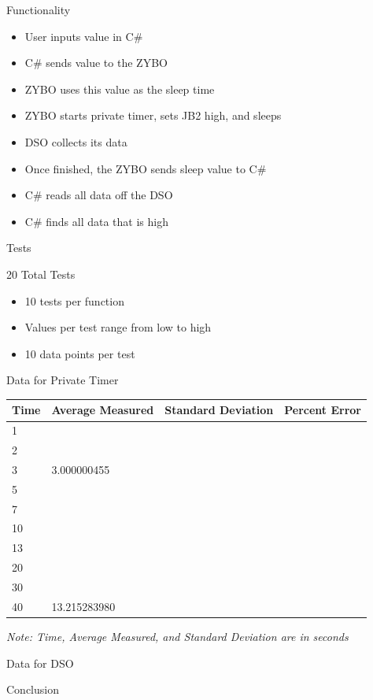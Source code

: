 \documentclass[pdf]{beamer}
\begin{document}
\begin{frame}{Functionality}

  \begin{itemize}
  \item User inputs value in C\#
  \item C\# sends value to the ZYBO
  \end{itemize}
  
  \pause

  \begin{itemize}
  \item ZYBO uses this value as the sleep time
  \item ZYBO starts private timer, sets JB2 high, and sleeps
  \item DSO collects its data
  \end{itemize}
  
  \pause
  
  \begin{itemize}
  \item Once finished, the ZYBO sends sleep value to C\#
  \item C\# reads all data off the DSO
  \item C\# finds all data that is high
  \end{itemize}

\end{frame}

\begin{frame}{Tests}

  20 Total Tests
  \begin{itemize}
  \item 10 tests per function
  \item Values per test range from low to high
  \item 10 data points per test
  \end{itemize}
    
\end{frame}

\begin{frame}{Data for Private Timer}
  \begin{tabular}{|l|l|l|l|}
    \hline
    Time & Average Measured & Standard Deviation & Percent Error\\
    \hline
    1 &  &  & \\ \hline
    2 &  &  & \\ \hline
    3 & 3.000000455 &  & \\ \hline
    5 &  &  & \\ \hline
    7 &  &  & \\ \hline
    10 &  &  & \\ \hline
    13 &  &  & \\ \hline
    20 &  &  & \\ \hline
    30 &  &  & \\ \hline
    40 & 13.215283980 &  & \\
    \hline
  \end{tabular}

  \small\emph{Note: Time, Average Measured, and Standard Deviation are in seconds}

\end{frame}

\begin{frame}{Data for DSO}

\end{frame}

\begin{frame}{Conclusion}
\end{frame}
\end{document}
